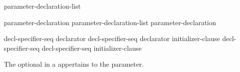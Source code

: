 %
\begin{bnf}
\br
     \br
    parameter-declaration-list \terminal{,} 
\end{bnf}

\begin{bnf}
\br
    parameter-declaration\br
    parameter-declaration-list \terminal{,} parameter-declaration
\end{bnf}

\begin{bnf}
\br
     decl-specifier-seq declarator\br
     decl-specifier-seq declarator \terminal{=} initializer-clause\br
     decl-specifier-seq \br
     decl-specifier-seq  \terminal{=} initializer-clause
\end{bnf}

The optional  in a 
appertains to the parameter.


